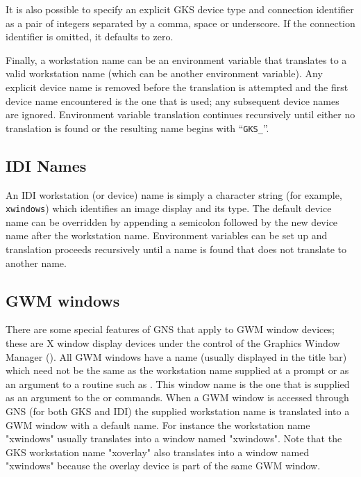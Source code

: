 It is also possible to specify an explicit GKS device type and connection
identifier as a pair of integers separated by a comma, space or underscore. If
the connection identifier is omitted, it defaults to zero.

Finally, a workstation name can be an environment
variable that translates to a valid workstation name (which can be another
environment variable). Any explicit device
name is removed before the translation is attempted and the first device name
encountered is the one that is used; any subsequent device names are ignored.
Environment variable translation continues recursively until either no 
translation is found or the resulting name begins with ``{\tt{GKS\_}}''.

\subsection{IDI Names}

An IDI workstation (or device) name is simply a character string (for example,
{\tt xwindows}) which identifies an image display and its type. The default 
device name can be overridden by appending a semicolon followed by the new
device name after the workstation name. 
Environment variables can be set up and
translation proceeds recursively until a name is found that does not
translate to another name.

\subsection{GWM windows}

There are some special features of GNS that apply to GWM window devices;
these are X window display devices under the control of the Graphics
Window Manager (). 
All GWM windows have a name (usually displayed in the title
bar) which need not be the same as the workstation name supplied at a prompt
or as an argument to a routine such as 
. This window name is the one
that is supplied as an argument to the 
 or 
 commands. When a
GWM window is accessed through GNS (for both GKS and IDI) the supplied
workstation name is translated into a GWM window with a default name. For
instance the workstation name "xwindows" usually translates into a window
named "xwindows". Note that the GKS workstation name "xoverlay" also
translates into a window named "xwindows" because the overlay device is part
of the same GWM window.

